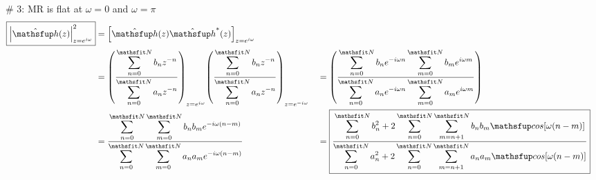 
\newpage
\# 3: MR is flat at $\omega=0$ and $\omega=\pi$ \label{equ:mrflat}
\vfill
{\LARGE\begin{align*}
  \boxed{\abs{\Zh(z)}^2_{z=e^{i\omega}}} 
    &= \brs{\Zh(z)\Zh^\ast(z)}_{z=e^{i\omega}}
  \\&= \brp{\frac{\ds\sum_{n=0}^{\xN}b_n z^{-n}}{\ds\sum_{n=0}^{\xN}a_n z^{-n}}}_{z=e^{i\omega}}  
       \brp{\frac{\ds\sum_{n=0}^{\xN}b_n z^{-n}}{\ds\sum_{n=0}^{\xN}a_n z^{-n}}}_{z=e^{-i\omega}}  
   &&= \brp{\frac{\ds\sum_{n=0}^{\xN}b_n e^{-i\omega n}\ds\sum_{m=0}^{\xN}b_m e^{i\omega m}}
                 {\ds\sum_{n=0}^{\xN}a_n e^{-i\omega n}\ds\sum_{m=0}^{\xN}a_m e^{i\omega m}}}
  \\&=     {\frac{\ds\sum_{n=0}^{\xN}\ds\sum_{m=0}^{\xN} b_n b_m e^{-i\omega(n-m)}}
                 {\ds\sum_{n=0}^{\xN}\ds\sum_{m=0}^{\xN} a_n a_m e^{-i\omega(n-m)}}}
   &&=\boxed{\frac{\ds\sum_{n=0}^{\xN}b_n^2 + 2\sum_{n=0}^{\xN}\ds\sum_{m=n+1}^{\xN} b_n b_m \cos\brs{\omega(n-m)}}
                  {\ds\sum_{n=0}^{\xN}a_n^2 + 2\sum_{n=0}^{\xN}\ds\sum_{m=n+1}^{\xN} a_n a_m \cos\brs{\omega(n-m)}}}
\end{align*}}\label{equ:mr}
\vfill\mbox{}

